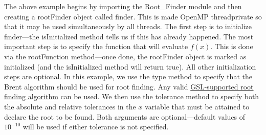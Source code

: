 The above example begins by importing the {\normalfont \ttfamily Root\_Finder} module and then creating a {\normalfont \ttfamily rootFinder} object called {\normalfont \ttfamily finder}. This is made OpenMP {\normalfont \ttfamily threadprivate} so that it may be used simultaneously by all threads. The first step is to initialize {\normalfont \ttfamily finder}---the {\normalfont \ttfamily isInitialized} method tells us if this has already happened. The most important step is to specify the function that will evaluate $f(x)$. This is done via the {\normalfont \ttfamily rootFunction} method---once done, the {\normalfont \ttfamily rootFinder} object is marked as initialized (and the {\normalfont \ttfamily isInitialized} method will return {\normalfont \ttfamily true}). All other initialization steps are optional. In this example, we use the {\normalfont \ttfamily type} method to specify that the {\normalfont \ttfamily Brent} algorithm should be used for root finding. Any valid \href{http://www.gnu.org/software/gsl/manual/html_node/Root-Bracketing-Algorithms.html}{GSL-supported root finding algorithm} can be used. We then use the {\normalfont \ttfamily tolerance} method to specify both the absolute and relative tolerances in the $x$ variable that must be attained to declare the root to be found. Both arguments are optional---default values of $10^{-10}$ will be used if either tolerance is not specified. 

